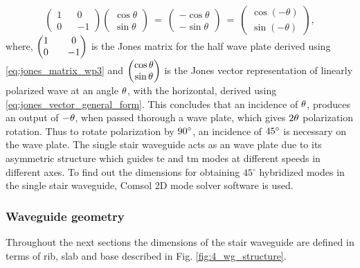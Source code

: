 \documentclass[../report.tex]{subfiles}
\begin{document}
\begin{equation}\label{eq:wave_plate_pr}
\left( \begin{matrix} 1& & 0\\ 0& & -1\end{matrix} \right) \left( \begin{matrix} \cos \theta \\ \sin \theta \end{matrix} \right) ~ = ~ \left( \begin{matrix} -\cos \theta \\ -\sin \theta \end{matrix}\right) ~ = ~ \left( \begin{matrix} \cos \left(-\theta\right) \\ \sin \left(-\theta\right) \end{matrix} \right), 
\end{equation}
where, $\mathrm{\left( \begin{matrix} 1& & 0\\ 0& & -1\end{matrix} \right)}$ is the Jones matrix for the half wave plate derived using \ref{eq:jones_matrix_wp3} and $\mathrm{\left( \begin{matrix} \cos \theta \\ \sin \theta \end{matrix} \right)}$ is the Jones vector representation of linearly polarized wave at an angle $\mathrm{\theta}$, with the horizontal, derived using \ref{eq:jones_vector_general_form}. This concludes that an incidence of $\mathrm{\theta}$, produces an output of $\mathrm{-\theta}$, when passed thorough a wave plate, which gives $\mathrm{2\theta}$ polarization rotation. Thus to rotate polarization by $\mathrm{90{^\circ}}$, an incidence of $\mathrm{45{^\circ}}$ is necessary on the wave plate. The single stair waveguide acts as an wave plate due to its asymmetric structure which guides \gls{te} and \gls{tm} modes at different speeds in different axes. To find out the dimensions for obtaining $45{^\circ}$ hybridized modes in the single stair waveguide, Comsol 2D mode solver software is used. 

\subsubsection{Waveguide geometry}
Throughout the next sections the dimensions of the stair waveguide are defined in terms of rib, slab and base described in Fig. \ref{fig:4_wg_structure}.   
\end{document}
